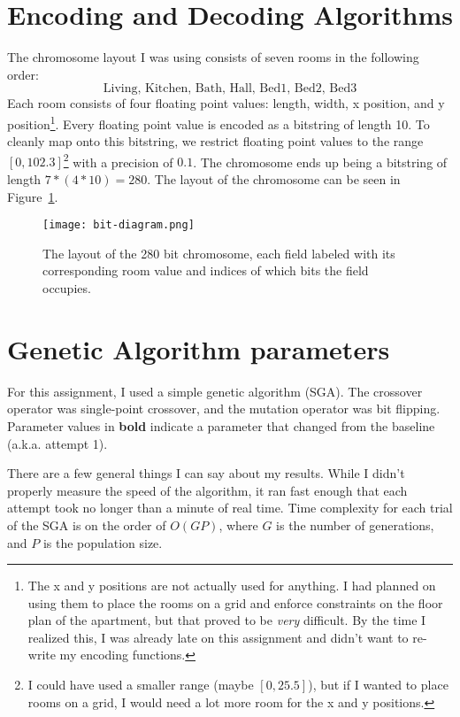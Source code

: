 \documentclass[12pt, letterpaper]{article}
\begin{document}
\vspace{2in}
\pagebreak
\section{Encoding and Decoding Algorithms}

The chromosome layout I was using consists of seven rooms in the following order:
\[\text{Living, Kitchen, Bath, Hall, Bed1, Bed2, Bed3}\]
Each room consists of four floating point values: length, width, x position, and y position\footnote{
    The x and y positions are not actually used for anything.
    I had planned on using them to place the rooms on a grid and enforce constraints on the floor plan of the apartment,
    but that proved to be \textit{very} difficult.
    By the time I realized this, I was already late on this assignment
    and didn't want to re-write my encoding functions.
}.
Every floating point value is encoded as a bitstring of length 10.
To cleanly map onto this bitstring, we restrict floating point values to the range $[0, 102.3]$\footnote{
    I could have used a smaller range (maybe $[0, 25.5]$),
    but if I wanted to place rooms on a grid, I would need a lot more room for the x and y positions.
} with a precision of $0.1$.
The chromosome ends up being a bitstring of length $7 * (4 * 10) = 280$.
The layout of the chromosome can be seen in Figure~\ref{Fig:Bits}.

\begin{figure}[H]
    \centerline{\texttt{[image: bit-diagram.png]}}
    \caption{The layout of the 280 bit chromosome, each field labeled with its corresponding room value and indices of which bits the field occupies.}\label{Fig:Bits}
\end{figure}

\pagebreak
\section{Genetic Algorithm parameters}

For this assignment, I used a simple genetic algorithm (SGA).
The crossover operator was single-point crossover, and the mutation operator was bit flipping.
Parameter values in \textbf{bold} indicate a parameter that changed from the baseline (a.k.a. attempt 1).

There are a few general things I can say about my results.
While I didn't properly measure the speed of the algorithm,
it ran fast enough that each attempt took no longer than a minute of real time.
Time complexity for each trial of the SGA is on the order of $O(GP)$,
where $G$ is the number of generations, and $P$ is the population size.
\end{document}

